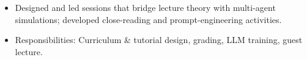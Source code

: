 \begin{itemize}
  \item Designed and led sessions that bridge lecture theory with multi-agent simulations; developed close-reading and prompt-engineering activities.
\end{itemize}

\begin{itemize}
   \item Responsibilities: Curriculum & tutorial design, grading, LLM training, guest lecture.
\end{itemize}


